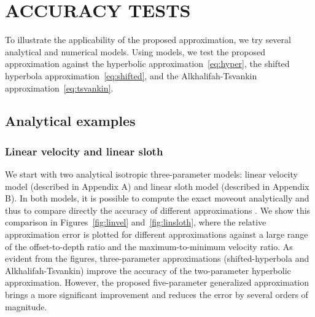 \section{ACCURACY TESTS}
To illustrate the applicability of the proposed approximation, we try
several analytical and numerical models. Using 
 models, we test the proposed approximation against the
hyperbolic approximation~\ref{eq:hyper}, the shifted hyperbola
approximation~\ref{eq:shifted}, and the Alkhalifah-Tsvankin
approximation~\ref{eq:tsvankin}.

\subsection{Analytical examples}

\subsubsection{Linear velocity and linear sloth}

We start with two analytical isotropic three-parameter models: linear
velocity model (described in Appendix A) and linear sloth model
(described in Appendix B). In both models, it is possible to compute
the exact moveout analytically and thus to compare directly the
accuracy of different approximations . We
show this comparison in Figures~\ref{fig:linvel}
and~\ref{fig:linsloth}, where the relative  
approximation error is plotted for different approximations against a
large range of the offset-to-depth ratio and the maximum-to-minimum
velocity ratio. As evident from the figures, three-parameter
approximations (shifted-hyperbola and Alkhalifah-Tsvankin) improve the
accuracy of the two-parameter hyperbolic approximation. However, the
proposed five-parameter generalized approximation brings a more
significant improvement and reduces the error by several orders of
magnitude.



